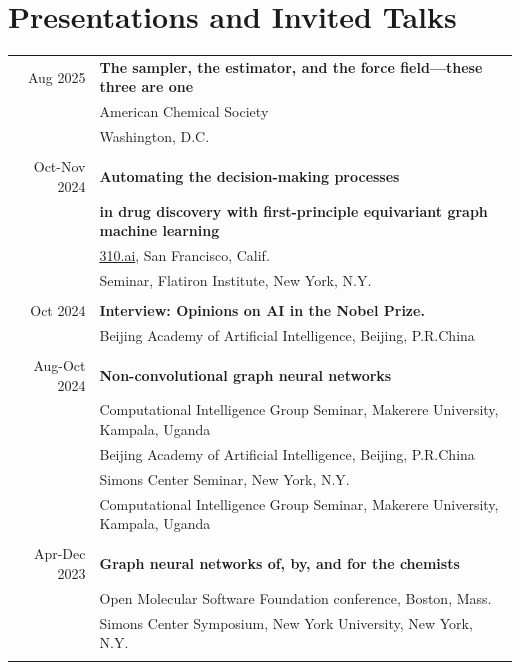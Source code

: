 \section{Presentations and Invited Talks}
\begin{tabular}{rl}

Aug 2025 & \textbf{The sampler, the estimator, and the force field---these three are one}\\
& American Chemical Society \\
& Washington, D.C.\\\\

Oct-Nov 2024 & \textbf{Automating the decision-making processes} \\
& \textbf{in drug discovery with first-principle equivariant graph machine learning}\\
& \url{310.ai}, San Francisco, Calif.\\
& Seminar, Flatiron Institute, New York, N.Y.\\\\

Oct 2024 & \textbf{Interview: Opinions on AI in the Nobel Prize.}\\
& Beijing Academy of Artificial Intelligence, Beijing, P.R.China\\\\

Aug-Oct 2024 & \textbf{Non-convolutional graph neural networks}\\
& Computational Intelligence Group Seminar, Makerere University, Kampala, Uganda \\
& Beijing Academy of Artificial Intelligence, Beijing, P.R.China\\
& Simons Center Seminar, New York, N.Y. \\
& Computational Intelligence Group Seminar, Makerere University, Kampala, Uganda\\\\



Apr-Dec 2023 & \textbf{Graph neural networks of, by, and for the chemists} \\
& Open Molecular Software Foundation conference, Boston, Mass.\\
& Simons Center Symposium, New York University, New York, N.Y.\\\\



\end{tabular}
